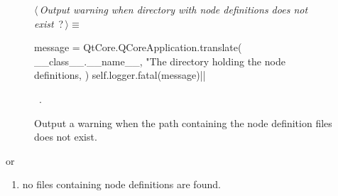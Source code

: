 \documentclass[%
    a4paper,    %
    justified,  %
    nobib,      %
    openany     %
]{tufte-book}
\makeatletter
\def\tuftebreak{%
  \if@nobreak\else
    \par
    \ifdim\lastskip<\tufteskipamount
      \removelastskip \penalty -100
      \tufteskip
    \fi
  \fi
}
\makeatother
\begin{document}
\begin{figure}[!h]
  \begin{flushleft} \small
\begin{minipage}{\linewidth}\label{scrap9}\raggedright\small
{} $\langle\,${\itshape Output warning when directory with node definitions does not exist}\nobreak\ {\footnotesize {?}}$\,\rangle\equiv$
\vspace{-1ex}
\begin{pythoncode}
    message = QtCore.QCoreApplication.translate(
        __class__.__name__,
        "The directory holding the node definitions, %
    )
    self.logger.fatal(message)|\NWsep|
\end{pythoncode}
\vspace{1.5ex}
\footnotesize
\begin{list}{}{\setlength{\itemsep}{-\parsep}\setlength{\itemindent}{-\leftmargin}}
\item \NWtxtMacroRefIn\ .

\item{}
\end{list}
\end{minipage}\vspace{4ex}
\end{flushleft}
\caption{Output a warning when the path containing the node definition files
    does not exist.}
  \label{lst:nodes-controller-load-node-defs-warning}
\end{figure}

\tuftebreak{}or

\begin{enumerate}[resume]
  \item no files containing node definitions are found.
\end{enumerate}
  
\end{document}
